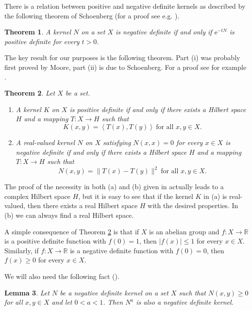 \documentclass[a4paper,oneside]{amsart}
\newtheorem{thm}{Theorem}[section]
\newtheorem{lem}[thm]{Lemma}
\theoremstyle{definition}
\begin{document}
There is a relation between positive and negative definite kernels as described by the following theorem of Schoenberg (for a proof see e.g. \cite[Proposition 8.4]{bl}).

\begin{thm}\label{neg_pos_relation}
A kernel $N$ on a set $X$ is negative definite if and only if ${\mathrm{e}}^{-tN}$ is positive definite for every $t>0$.
\end{thm}

The key result for our purposes is the following theorem. Part (i) was probably first proved by Moore, part (ii) is due to Schoenberg. For a proof see for example \cite[Proposition~8.5]{bl}.

\begin{thm}\label{moore-schoe}
Let $X$ be a set.

\begin{enumerate}
\item A kernel $K$ on $X$ is positive definite if and only if there exists a Hilbert space $H$ and a mapping $T:X\to H$ such that $$K(x,y)=\left\langle T(x),T(y)\right\rangle\ \text{for all }x,y\in X.$$
\item A real-valued kernel $N$ on $X$ satisfying $N(x,x)=0$ for every $x\in X$ is negative definite if and only if there exists a Hilbert space $H$ and a mapping $T:X\to H$ such that 
$$N(x,y)=\|T(x)-T(y)\|^2\ \text{for all }x,y\in X.$$
\end{enumerate}
\end{thm}

The proof of the necessity in both (a) and (b) given in \cite[Proposition~8.5]{bl} actually leads to a complex Hilbert space $H$, but it is easy to see that if the kernel $K$ in (a) is real-valued, then there exists a real Hilbert space $H$ with the desired properties. In (b) we can always find a real Hilbert space.

A simple consequence of Theorem \ref{moore-schoe} is that if $X$ is an abelian group and $f:X\to{\mathbb{R}}$ is a positive definite function with $f(0)=1$, then $|f(x)|\leq1$ for every $x\in X$. Similarly, if $f:X\to{\mathbb{R}}$ is a negative definite function with $f(0)=0$, then $f(x)\geq0$ for every $x\in X$.

We will also need the following fact (\cite[p. 186, Examples. (iii)]{bl}).

\begin{lem}\label{neg_def_pow}
Let $N$ be a negative definite kernel on a set $X$ such that $N(x,y)\geq0$ for all $x,y\in X$ and let $0<a<1$. Then $N^a$ is also a negative definite kernel. 
\end{lem}
\end{document}
